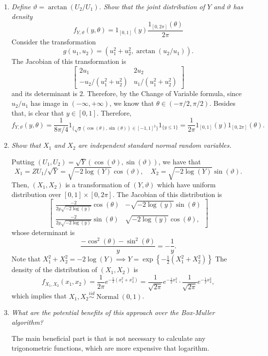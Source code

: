 \documentclass[a4paper,12pt]{article}
\theoremstyle{definition}
\begin{document}
\begin{enumerate}
    \item {\it Define $\vartheta = \arctan(U_2/U_1)$. Show that the joint
    distribution of $Y$ and $\vartheta$ has density 
    $$
    f_{Y, \vartheta}(y,\theta) = 1_{[0,1]}(y)\frac{1_{[0,2\pi]}(\theta)}{2\pi}
    $$}
    Consider the transformation
    $$
    g(u_1, u_2) = \left(u_1^2 + u_2^2, \arctan(u_2/u_1)\right).
    $$ 
    The Jacobian of this transformation is 
    $$
    \begin{bmatrix}
        2u_1 & 2u_2 \\ 
        -u_2/(u_1^2 + u_2^2) & u_1/(u_1^2 + u_2^2)
    \end{bmatrix}
    $$
    and its determinant is $2$. Therefore, by the Change of Variable formula,
    since $u_2/u_1$ has image in $(-\infty, +\infty)$, we know that $\theta \in (-\pi/2,
    \pi/2)$. Besides that, is clear that $y \in [0,1]$. Therefore, 
    $$
    f_{Y, \vartheta}(y,\theta) = \frac{1}{8\pi/4}1_{\{\sqrt{y}(\cos(\theta), \sin(\theta)) \in [-1,1]^2\}}1_{\{y \le 1\}} = \frac{1}{2\pi}1_{[0,1]}(y)1_{[0,2\pi]}(\theta).
    $$

    \item {\it Show that $X_1$ and $X_2$ are independent standard normal random variables.}
    
    Putting $(U_1, U_2) = \sqrt{Y}(\cos(\vartheta), \sin(\vartheta))$, we have
    that 
    $$X_1 = ZU_1/\sqrt{Y} = \sqrt{-2\log(Y)}\cos(\vartheta), \quad X_2 =
    \sqrt{-2\log(Y)}\sin(\vartheta).$$
    Then, $(X_1, X_2)$ is a transformation of $(Y,\vartheta)$ which have uniform
    distribution over $[0,1] \times [0, 2\pi]$. The Jacobian of this
    distribution is 
    $$
    \begin{bmatrix}
        \frac{-2}{2y\sqrt{-2\log(y)}}\cos(\theta) & -\sqrt{-2\log(y)}\sin(\theta) \\
        \frac{-2}{2y\sqrt{-2\log(y)}}\sin(\theta) & \sqrt{-2\log(y)}\cos(\theta),
    \end{bmatrix}
    $$
    whose determinant is 
    $$\frac{-\cos^2(\theta) - \sin^2(\theta)}{y} = -\frac{1}{y}.$$
    Note that $X_1^2 + X_2^2 = -2\log(Y) \implies Y =
    \exp\left\{-\frac{1}{2}(X_1^2 + X_2^2)\right\}$
     The density of the distribution of $(X_1, X_2)$ is 
    $$
    f_{X_1, X_2}(x_1, x_2) = \frac{1}{2\pi} e^{-\frac{1}{2}(x_1^2 + x_2^2)} = \frac{1}{\sqrt{2\pi}}e^{-\frac{1}{2}x_1^2} \cdot \frac{1}{\sqrt{2\pi}}e^{-\frac{1}{2}x_2^2},
    $$
    which implies that $X_1, X_2 \overset{iid}{\sim}
    \operatorname{Normal}(0,1)$.
    
    \item {\it  What are the potential benefits of this approach over the Box-Muller algorithm?}
    
    The main beneficial part is that is not necessary to calculate any
    trigonometric functions, which are more expensive that logarithm. 

\end{enumerate}

% 
% 
\end{document}
